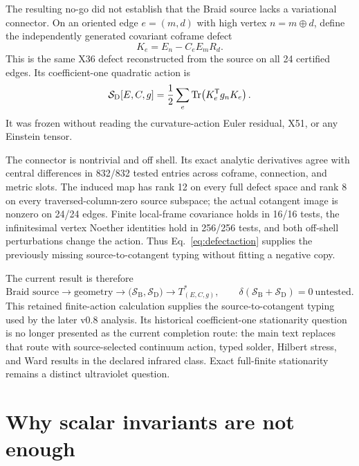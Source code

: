 The resulting no-go did not establish that the Braid source lacks a variational connector. On an oriented edge $e=(m,d)$ with high vertex $n=m\oplus d$, define the independently generated covariant coframe defect
\begin{equation}\label{eq:defectconnector}
 K_e=E_n-C_eE_mR_d.
\end{equation}
This is the same X36 defect reconstructed from the source on all 24 certified edges. Its coefficient-one quadratic action is
\begin{equation}\label{eq:defectaction}
 \mathcal S_{\mathrm D}[E,C,g]
 =\frac12\sum_e\operatorname{Tr}\!\left(K_e^{\mathsf T}g_nK_e\right).
\end{equation}
It was frozen without reading the curvature-action Euler residual, X51, or any Einstein tensor.

The connector is nontrivial and off shell. Its exact analytic derivatives agree with central differences in 832/832 tested entries across coframe, connection, and metric slots. The induced map has rank 12 on every full defect space and rank 8 on every traversed-column-zero source subspace; the actual cotangent image is nonzero on 24/24 edges. Finite local-frame covariance holds in 16/16 tests, the infinitesimal vertex Noether identities hold in 256/256 tests, and both off-shell perturbations change the action. Thus Eq.~\eqref{eq:defectaction} supplies the previously missing source-to-cotangent typing without fitting a negative copy.

The current result is therefore
\begin{equation}\label{eq:frontier}
 \boxed{
 \text{Braid source}\to\text{geometry}
 \to\bigl(\mathcal S_{\mathrm B},\mathcal S_{\mathrm D}\bigr)
 \to T^*_{(E,C,g)},
 \qquad
 \delta\!\left(\mathcal S_{\mathrm B}+\mathcal S_{\mathrm D}\right)=0
 \ \text{untested}.}
\end{equation}
This retained finite-action calculation supplies the source-to-cotangent typing used by the later v0.8 analysis. Its historical coefficient-one stationarity question is no longer presented as the current completion route: the main text replaces that route with source-selected continuum action, typed solder, Hilbert stress, and Ward results in the declared infrared class. Exact full-finite stationarity remains a distinct ultraviolet question.

\section{Why scalar invariants are not enough}

